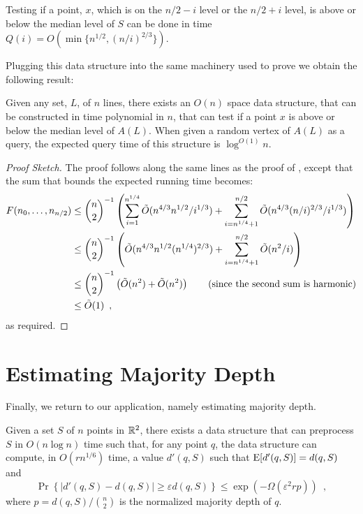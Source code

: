 \documentclass{patmorin}
\newcommand{\eps}{\varepsilon}
\begin{document}
\begin{lem}
  Testing if a point, $x$, which is on the $n/2-i$ level or the $n/2+i$
  level, is above or below the median level of $S$ can be done in time
  $Q(i) = O(\min\{n^{1/2},(n/i)^{2/3}\})$.
\end{lem}

Plugging this data structure into the same machinery used to prove
 we obtain the following result:

\begin{thm}
  Given any set, $L$, of $n$ lines, there exists an $O(n)$ space data
  structure, that can be constructed in time polynomial in $n$, that
  can test if a point $x$ is above or below the median level of $A(L)$.
  When given a random vertex of $A(L)$ as a query, the expected query
  time of this structure is $\log^{O(1)} n$.
\end{thm}

\begin{proof}[Proof Sketch]
  The proof follows along the same lines as the proof of
  , except that the sum that bounds the expected
  running time becomes:
  \begin{align*}
     F(n_0,\ldots,n_{n/2})
       & \le \binom{n}{2}^{-1}\left(\sum_{i=1}^{n^{1/4}}\tilde{O}(n^{4/3}n^{1/2}/i^{1/3})
      + \sum_{i=n^{1/4}+1}^{n/2}\tilde{O}(n^{4/3}(n/i)^{2/3}/i^{1/3}) \right) \\
     & \le \binom{n}{2}^{-1}\left(\tilde{O}(n^{4/3}n^{1/2}(n^{1/4})^{2/3})
      + \sum_{i=n^{1/4}+1}^{n/2}\tilde{O}(n^{2}/i) \right) \\
     & \le \binom{n}{2}^{-1}\left(\tilde{O}(n^2) + \tilde{O}(n^{2}) \right) 
       \qquad \text{(since the second sum is harmonic)} \\
     & \le \tilde{O}(1) \enspace ,
  \end{align*}
  as required.
\end{proof}


\section{Estimating Majority Depth}

Finally, we return to our application, namely estimating majority depth. 

\begin{thm}
  Given a set $S$ of $n$ points in $\mathbb{R}^2$, there exists a data structure
  that can preprocess $S$ in $O(n\log n)$ time such that, for any point
  $q$, the data structure can compute, in $O(rn^{1/6})$ time, a value
  $d'(q,S)$ such that $\mathrm{E}[d'(q,S)]=d(q,S)$ and
  \[
     \Pr\left\{|d'(q,S)-d(q,S)| \ge \eps d(q,S)\right\} 
        \le \exp\left(-\Omega\left(\eps^2rp\right)\right) \enspace ,
  \]
  where $p=d(q,S)/\binom{n}{2}$ is the normalized majority depth of $q$.
\end{thm}
\end{document}

